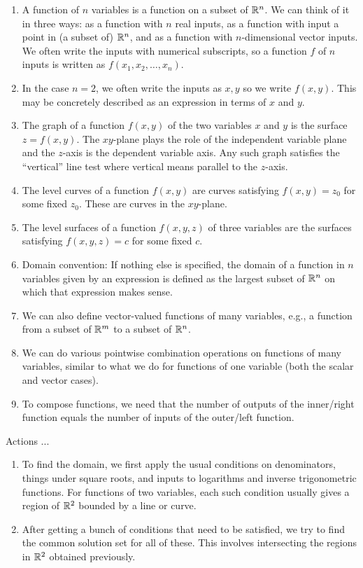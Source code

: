 \documentclass[10pt]{amsart}
\begin{document}
\begin{enumerate}
\item A function of $n$ variables is a function on a subset of
  $\mathbb{R}^n$. We can think of it in three ways: as a function with $n$
  real inputs, as a function with input a point in (a subset of)
  $\mathbb{R}^n$, and as a function with $n$-dimensional vector inputs. We
  often write the inputs with numerical subscripts, so a function $f$
  of $n$ inputs is written as $f(x_1,x_2,\dots,x_n)$.
\item In the case $n = 2$, we often write the inputs as $x,y$ so we
  write $f(x,y)$. This may be concretely described as an expression in
  terms of $x$ and $y$.
\item The graph of a function $f(x,y)$ of the two variables $x$ and
  $y$ is the surface $z = f(x,y)$. The $xy$-plane plays the role of
  the independent variable plane and the $z$-axis is the dependent
  variable axis. Any such graph satisfies the ``vertical'' line test
  where vertical means parallel to the $z$-axis.
\item The level curves of a function $f(x,y)$ are curves satisfying
  $f(x,y) = z_0$ for some fixed $z_0$. These are curves in the
  $xy$-plane.
\item The level surfaces of a function $f(x,y,z)$ of three variables
  are the surfaces satisfying $f(x,y,z) = c$ for some fixed $c$.
\item Domain convention: If nothing else is specified, the domain of a
  function in $n$ variables given by an expression is defined as the
  largest subset of $\mathbb{R}^n$ on which that expression makes sense.
\item We can also define vector-valued functions of many variables,
  e.g., a function from a subset of $\mathbb{R}^m$ to a subset of $\mathbb{R}^n$.
\item We can do various pointwise combination operations on functions
  of many variables, similar to what we do for functions of one variable
  (both the scalar and vector cases).
\item To compose functions, we need that the number of outputs of the
  inner/right function equals the number of inputs of the outer/left
  function.
\end{enumerate}

Actions ...

\begin{enumerate}
\item To find the domain, we first apply the usual conditions on
  denominators, things under square roots, and inputs to logarithms
  and inverse trigonometric functions. For functions of two variables,
  each such condition usually gives a region of $\mathbb{R}^2$ bounded by a
  line or curve.
\item After getting a bunch of conditions that need to be satisfied,
  we try to find the common solution set for all of these. This
  involves intersecting the regions in $\mathbb{R}^2$ obtained previously.
\end{enumerate}
\end{document}
